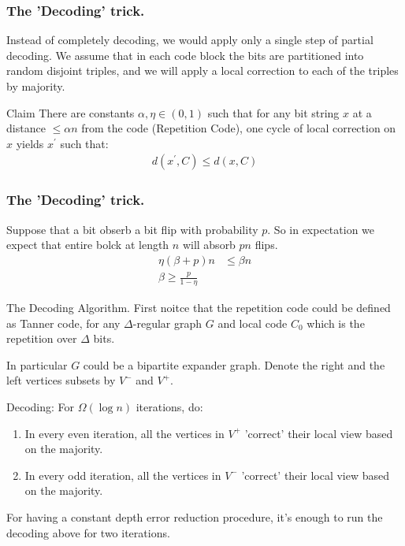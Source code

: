 \documentclass{beamer}
\begin{document}
\begin{frame}
  \frametitle{The 'Decoding' trick.} 

Instead of completely decoding, we would apply only a single step of partial decoding. We assume that in each code block the bits are partitioned into random disjoint triples, and we will apply a local correction to each of the triples by majority.



\begin{block}{Claim}
There are constants $\alpha, \eta \in (0,1)$ such that for any bit string $x$ at a distance $\le \alpha n$ from the code (Repetition Code), one cycle of local correction on $x$ yields $x^\prime$ such that:
  \begin{equation*}
    \begin{split}
      d(x^{\prime}, C) \le d(x, C)
    \end{split}
  \end{equation*}
\end{block}
\end{frame}


\begin{frame}
  \frametitle{The 'Decoding' trick.} 
  
  Suppose that a bit obserb a bit flip with probability $p$. So in expectation we expect that entire bolck at length $n$ will absorb $pn$ flips.  
  \begin{equation*}
    \begin{split}
      \eta \left( \beta + p  \right) n &\le \beta n \\ 
      \beta \ge \frac{p}{ 1 - \eta}
    \end{split}
  \end{equation*}


\end{frame}

\begin{frame}{The Decoding Algorithm.}
  First noitce that the repetition code could be defined as Tanner code, for any $\Delta$-regular graph $G$ and local code $C_{0}$ which is the repetition over $\Delta$ bits.   


  In particular $G$ could be a bipartite expander graph. Denote the right and the left vertices subsets by $V^{-}$ and $V^{+}$.
  \begin{block}{Decoding:}
    For $\Omega\left( \log n \right)$ iterations, do: 
  \begin{enumerate}
    \item In every even iteration, all the vertices in $V^{+}$ 'correct' their local view based on the majority.
    \item In every odd iteration, all the vertices in $V^{-}$ 'correct' their local view based on the majority.
  \end{enumerate}
For having a constant depth error reduction procedure, it's enough to run the decoding above for two iterations.
\end{block}

\end{frame}
\end{document}
